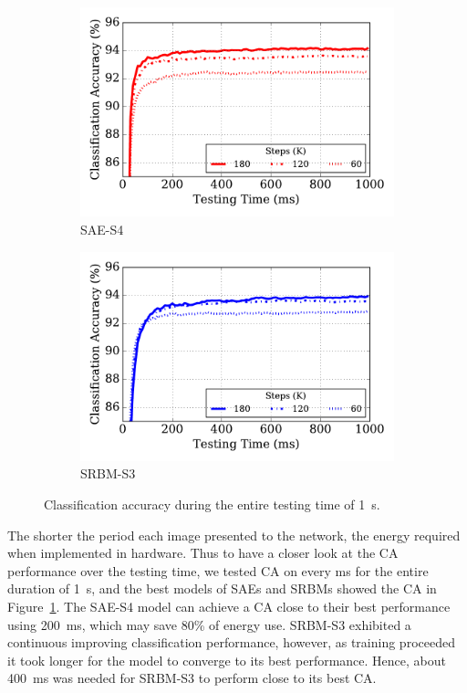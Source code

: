 \begin{figure}
	\centering
	\begin{subfigure}[t]{0.45\textwidth}
		\includegraphics[width=\textwidth]{pics_sdlm/43_MNIST_SAE_all/latency.pdf}
		\caption{SAE-S4}
	\end{subfigure}
	\begin{subfigure}[t]{0.45\textwidth}
		\includegraphics[width=\textwidth]{pics_sdlm/51_MNIST_SRBM_teach/latency.pdf}
		\caption{SRBM-S3}
	\end{subfigure}
	\caption{Classification accuracy during the entire testing time of 1~s.}
	\label{fig:latency}
\end{figure}

The shorter the period \protect{} \protect{} each image \protect{} presented to the network, the \protect{} energy required \protect{} when implemented in hardware.
Thus to have a closer look at the CA performance over the testing time, we tested \protect{} CA on every ms for the entire duration of 1~s, and the best models of SAEs and SRBMs showed the CA in Figure~\ref{fig:latency}.
The SAE-S4 model can achieve a CA close to their best performance \protect{} using \protect{} 200~ms, which may save 80\% of energy use.
SRBM-S3 exhibited a continuous improving classification performance, however, as training proceeded it took longer for the model to converge to its best performance.
Hence, about 400~ms was needed for SRBM-S3 to perform close to its best CA.

